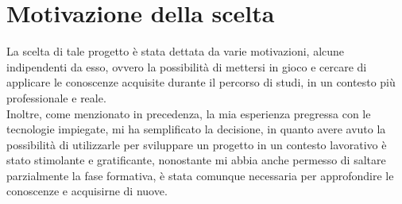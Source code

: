 \section{Motivazione della scelta}
\label{sec:motivazione-scelta}

La scelta di tale progetto è stata dettata da varie motivazioni, alcune indipendenti da esso, ovvero la possibilità di mettersi in gioco e cercare di applicare le conoscenze acquisite durante il percorso di studi, in un contesto più professionale e reale. \\
Inoltre, come menzionato in precedenza, la mia esperienza pregressa con le tecnologie impiegate, mi ha semplificato la decisione, in quanto avere avuto la possibilità di utilizzarle per sviluppare un progetto in un contesto lavorativo è stato stimolante e gratificante, nonostante mi abbia anche permesso di saltare parzialmente la fase formativa, è stata comunque necessaria per approfondire le conoscenze e acquisirne di nuove.
